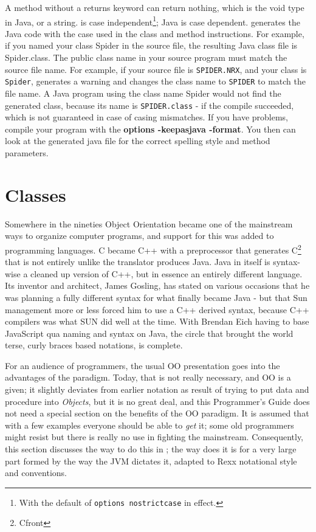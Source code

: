 {A \nr{} method without a returns keyword can return nothing, which is the void type in Java, or a \Rexx{} string. 
\nr{} is case independent\footnote{With the default of \texttt{options
  nostrictcase} in effect.}; Java is case dependent. \nr{} generates
the Java code with the case used in the class and method
instructions. For example, if you named your class Spider in the \nr{}
source file, the resulting Java class file is Spider.class.
The public class name in your source program must match the \nr{}
source file name. For example, if your source file is \texttt{SPIDER.NRX}, and
your class is \texttt{Spider}, \nr{} generates a warning and changes the
class name to \texttt{SPIDER} to match the file name. A Java program using the
class name Spider would not find the generated class, because its name
is \texttt{SPIDER.class} - if the compile succeeded, which is not guaranteed in
case of casing mismatches.
If you have problems, compile your \nr{} program with the \textbf{options
-keepasjava -format}. You then can look at the generated java file for the correct spelling style and method parameters.

\chapter{Classes}\label{classes}
Somewhere in the nineties Object Orientation became one of the
mainstream ways to organize computer programs, and support for this
was added to programming languages. C became C++ with a preprocessor
that generates C\footnote{Cfront} that is not entirely unlike the
  \nr{} translator produces Java. Java in itself is syntax-wise a
  cleaned up version of C++, but in essence an entirely different
  language. Its inventor and architect, James Gosling, has stated on
  various occasions that he was planning a fully different syntax for
  what finally became Java - but that Sun management more or less
  forced him to use a C++ derived syntax, because C++ compilers was
  what SUN did well at the time. With Brendan Eich having to base
  JavaScript qua naming and syntax on Java, the circle that brought
  the world terse, curly braces based notations, is complete.

For an audience of \Rexx{} programmers, the usual OO presentation goes
into the advantages of the paradigm. Today, that is not really
necessary, and OO is a given; it slightly deviates from earlier
notation as result of trying to put data and procedure into
\emph{Objects}, but it is no great deal, and this \nr{} Programmer's
Guide does not need a special section on the benefits of the OO
paradigm. It is assumed that with a few examples everyone should be
able to \emph{get} it; some old programmers might resist but there is
really no use in fighting the mainstream. Consequently, this section
discusses the way to do this in \nr{}; the way \nr{} does it is for a very
large part formed by the way the JVM dictates it, adapted to Rexx
notational style and conventions.

}
